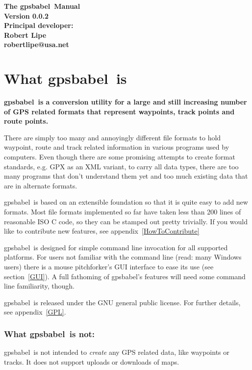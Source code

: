 \documentclass[12pt]{article}
\newcommand{\gpsbabel}{{\sc gpsbabel}}
\begin{document}
{\center
\Large \bfseries The \gpsbabel\ Manual\\[5mm]
Version 0.0.2\\[10mm]

{\rm \normalsize Principal developer:}\\
\large Robert Lipe\\[2mm]
robertlipe@usa.net\\
}

\tableofcontents

\newpage

\section{What \gpsbabel\ is}

{\bfseries \gpsbabel\ is a conversion utility for a large and still increasing number of GPS related formats that represent waypoints, track points and route points.}

There are simply too many and annoyingly different file formats to hold waypoint, route and track related information in various programs used by computers. Even though there are some promising attempts to create format standards, e.g. GPX as an XML variant, to carry all data types, there are too many programs that don't understand them yet and too much existing data that are in alternate formats.

\gpsbabel\ is based on an extensible foundation	so that it is quite easy to add new formats.  Most file formats implemented so far have taken less than 200 lines of reasonable ISO C code, so they can	be stamped out pretty trivially. If you would like to contribute new features, see appendix~\ref{HowToContribute}

\gpsbabel\ is designed for simple command line invocation for all supported platforms. For users not familiar with the command line (read: many Windows users) there is a mouse pitchforker's GUI interface to ease its use (see section~\ref{GUI}). A full fathoming of \gpsbabel 's features will need some command line familiarity, though.

\gpsbabel\ is released under the GNU general public license. For further details, see appendix~\ref{GPL}.


\subsubsection*{What \gpsbabel\ is not:}

\gpsbabel\ is not intended to {\em create} any GPS related data, like waypoints or tracks. It does not support uploads or downloads of maps.
\end{document}
